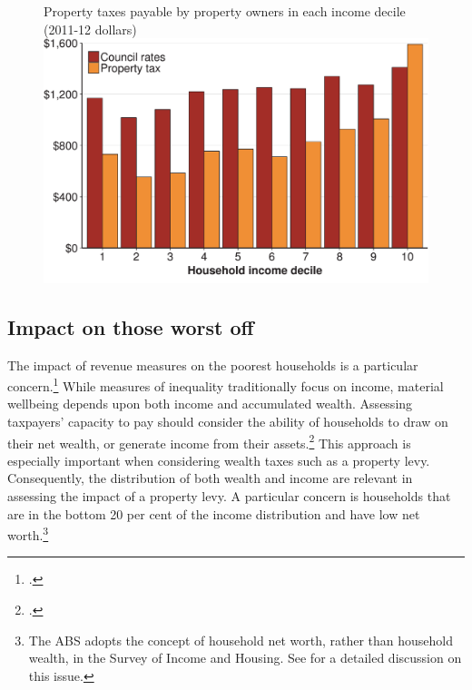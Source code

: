 \begin{figure}
%
{Property taxes payable by property owners in each income decile (2011-12 dollars)}
\includegraphics[width=\columnwidth]{Property-taxes/atlas/figure/Figure10-1.pdf}

\end{figure}

\subsection{Impact on those worst off}
The impact of revenue measures on the poorest households is a particular concern.\footcite[][21]{DaleyMcGannonSavageEtAl2013BalancingBudgets}  While measures of inequality traditionally focus on income, material wellbeing depends upon both income and accumulated wealth. Assessing taxpayers’ capacity to pay should consider the ability of households to draw on their net wealth, or generate income from their assets.\footcite[][180]{OECD2013d}  This approach is especially important when considering wealth taxes such as a property levy. Consequently, the distribution of both wealth and income are relevant in assessing the impact of a property levy. A particular concern is households that are in the bottom 20 per cent of the income distribution and have low net worth.\footnote{The ABS adopts the concept of household net worth, rather than household wealth, in the Survey of Income and Housing. See \textcite[][19]{ABS2014l} for a detailed discussion on this issue.} 

